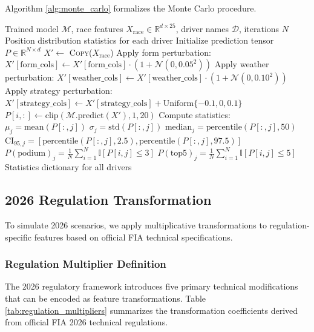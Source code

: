 \documentclass[conference]{IEEEtran}
\begin{document}
Algorithm \ref{alg:monte_carlo} formalizes the Monte Carlo procedure.

\begin{algorithm}
\caption{Monte Carlo Race Simulation}
\label{alg:monte_carlo}
\begin{algorithmic}[1]
\REQUIRE Trained model $\mathcal{M}$, race features $X_{\text{race}} \in \mathbb{R}^{d \times 25}$, driver names $\mathcal{D}$, iterations $N$
\ENSURE Position distribution statistics for each driver
\STATE Initialize prediction tensor $P \in \mathbb{R}^{N \times d}$
    \STATE $X' \leftarrow$ \textsc{Copy}($X_{\text{race}}$)
    \STATE Apply form perturbation: $X'[\text{form\_cols}] \leftarrow X'[\text{form\_cols}] \cdot (1 + \mathcal{N}(0, 0.05^2))$
    \STATE Apply weather perturbation: $X'[\text{weather\_cols}] \leftarrow X'[\text{weather\_cols}] \cdot (1 + \mathcal{N}(0, 0.10^2))$
    \STATE Apply strategy perturbation: $X'[\text{strategy\_cols}] \leftarrow X'[\text{strategy\_cols}] + \text{Uniform}\{-0.1, 0, 0.1\}$
    \STATE $P[i, :] \leftarrow \text{clip}(\mathcal{M}.\text{predict}(X'), 1, 20)$
\ENDFOR
{}
    \STATE Compute statistics:
    \STATE \quad $\mu_j = \text{mean}(P[:, j])$
    \STATE \quad $\sigma_j = \text{std}(P[:, j])$
    \STATE \quad $\text{median}_j = \text{percentile}(P[:, j], 50)$
    \STATE \quad $\text{CI}_{95,j} = [\text{percentile}(P[:, j], 2.5), \text{percentile}(P[:, j], 97.5)]$
    \STATE \quad $P(\text{podium})_j = \frac{1}{N}\sum_{i=1}^{N} \mathbb{I}[P[i,j] \leq 3]$
    \STATE \quad $P(\text{top5})_j = \frac{1}{N}\sum_{i=1}^{N} \mathbb{I}[P[i,j] \leq 5]$
\ENDFOR
\RETURN Statistics dictionary for all drivers
\end{algorithmic}
\end{algorithm}

\subsection{2026 Regulation Transformation}

To simulate 2026 scenarios, we apply multiplicative transformations to regulation-specific features based on official FIA technical specifications.

\subsubsection{Regulation Multiplier Definition}

The 2026 regulatory framework introduces five primary technical modifications that can be encoded as feature transformations. Table \ref{tab:regulation_multipliers} summarizes the transformation coefficients derived from official FIA 2026 technical regulations.
\end{document}
